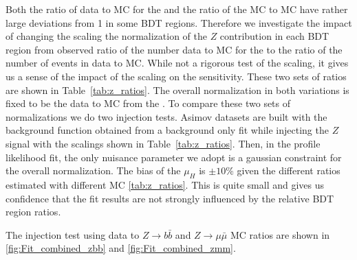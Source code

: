 
Both the ratio of data to MC for the \zmujets{} and the ratio of the \zmujets{} MC to \zjets{} MC have rather large deviations from 1 in some BDT regions.  Therefore we investigate the impact of changing the scaling the normalization of the $Z$ contribution in each BDT region from observed ratio of the number  data to MC for the \zmujets{} to the ratio of the number of events in \zmujets{} data to \zjets{} MC. While not a rigorous test of the scaling, it gives us a sense of the impact of the scaling on the sensitivity. These two sets of ratios are shown in Table~\ref{tab:z_ratios}. The overall normalization in both variations is fixed to be the data to MC from the \zmujets{}.  To compare these two sets of normalizations we do two injection tests.  Asimov datasets are built with the background function obtained from a background only fit while injecting the $Z$ signal  with the scalings shown in Table~\ref{tab:z_ratios}. Then, in the profile likelihood fit, the only \zjets{} nuisance parameter we adopt is a gaussian constraint for the overall normalization. The bias of the $\mu_H$ is $\pm 10\%$ given the different ratios estimated with different MC \ref{tab:z_ratios}.  This is quite small and gives us confidence that the fit results are not strongly influenced by the relative BDT region ratios.%

The injection test using data to $Z\rightarrow b \bar b$ and $Z\rightarrow \mu \bar \mu$ MC ratios are shown in \ref{fig:Fit_combined_zbb} and \ref{fig:Fit_combined_zmm}.





